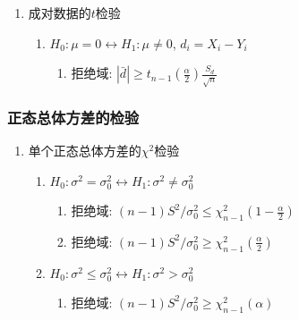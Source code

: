 \begin{enumerate}
\item 成对数据的$t$检验
\begin{enumerate}
\item $H_0:\mu=0\leftrightarrow H_1:\mu\neq0$, $d_i=X_i-Y_i$
\begin{enumerate}
\item 拒绝域: $|\bar{d}|\ge t_{n-1}{(\frac{\alpha}{2})} \frac{S_d}{\sqrt{n}}$
\end{enumerate}
\end{enumerate}

\end{enumerate}

\subsubsection{正态总体方差的检验}

\begin{enumerate}

\item 单个正态总体方差的$\chi^2$检验
\begin{enumerate}
\item $H_0:\sigma^2=\sigma^2_0\leftrightarrow H_1:\sigma^2\neq\sigma^2_0$
\begin{enumerate}
\item 拒绝域: $(n-1)S^2/\sigma^2_0\le\chi^2_{n-1}(1-\frac{\alpha}{2})$
\item 拒绝域: $(n-1)S^2/\sigma^2_0\ge\chi^2_{n-1}(\frac{\alpha}{2})$
\end{enumerate}
\item $H_0:\sigma^2\le\sigma^2_0\leftrightarrow H_1:\sigma^2>\sigma^2_0$
\begin{enumerate}
\item 拒绝域: $(n-1)S^2/\sigma^2_0\ge\chi^2_{n-1}(\alpha)$
\end{enumerate}
\end{enumerate}

\iffalse
\item 两个正态总体方差比的$F$检验
\begin{enumerate}
\item $H_0:\sigma^2_1=\sigma^2_2\leftrightarrow H_1:\sigma^2_1\neq\sigma^2_2$
\begin{enumerate}
\item 拒绝域: $S^2_1/S^2_2\le F_{m-1,n-1}(1-\frac{\alpha}{2})$
\item 拒绝域: $S^2_1/S^2_2\ge F_{m-1,n-1}(\frac{\alpha}{2})$
\end{enumerate}
\item $H'_0:\sigma^2_1\le\sigma^2_2\leftrightarrow H'_1:\sigma^2_1>\sigma^2_2$
\begin{enumerate}
\item 拒绝域: $S^2_1/S^2_2\ge F_{m-1,n-1}(\alpha)$
\end{enumerate}
\end{enumerate}
\fi

\end{enumerate}

